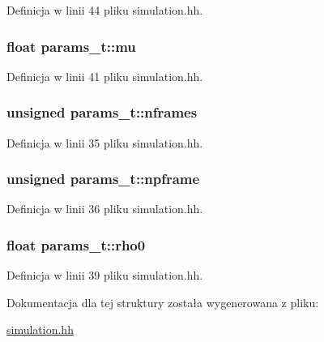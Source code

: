 Definicja w linii 44 pliku simulation.\+hh.

\hypertarget{structparams__t_a971359c29b2f946b477e4a1b3605fa3f}{}
\subsubsection[{mu}]{\setlength{\rightskip}{0pt plus 5cm}float params\+\_\+t\+::mu}\label{structparams__t_a971359c29b2f946b477e4a1b3605fa3f}


Definicja w linii 41 pliku simulation.\+hh.

\hypertarget{structparams__t_a2cecc28f4ca024657cf567047e2aba59}{}
\subsubsection[{nframes}]{\setlength{\rightskip}{0pt plus 5cm}unsigned params\+\_\+t\+::nframes}\label{structparams__t_a2cecc28f4ca024657cf567047e2aba59}


Definicja w linii 35 pliku simulation.\+hh.

\hypertarget{structparams__t_a06a1a567fd5ba13905514227e2bb710a}{}
\subsubsection[{npframe}]{\setlength{\rightskip}{0pt plus 5cm}unsigned params\+\_\+t\+::npframe}\label{structparams__t_a06a1a567fd5ba13905514227e2bb710a}


Definicja w linii 36 pliku simulation.\+hh.

\hypertarget{structparams__t_a2eb309edb681d0a998f23fc692a73781}{}
\subsubsection[{rho0}]{\setlength{\rightskip}{0pt plus 5cm}float params\+\_\+t\+::rho0}\label{structparams__t_a2eb309edb681d0a998f23fc692a73781}


Definicja w linii 39 pliku simulation.\+hh.



Dokumentacja dla tej struktury została wygenerowana z pliku\+:\begin{DoxyCompactItemize}
\item 
\hyperlink{simulation_8hh}{simulation.\+hh}\end{DoxyCompactItemize}
